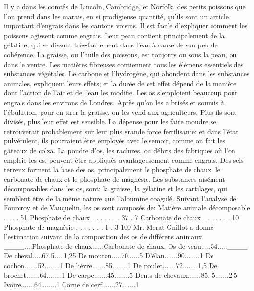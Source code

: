 Il y a dans les comtés de Lincoln, Cambridge, et Norfolk, des petits poissons que l'on prend dans les marais, en si prodigieuse quantité, qu'ils sont un article important d'engrais dans les cantons voisins.
Il est facile d'expliquer comment les poissons agissent comme engrais. Leur peau contient principalement de la gélatine, qui se dissout très-facilement dans l'eau à cause de son peu de cohérence. La graisse, ou l'huile des poissons, est toujours ou sous la peau, ou dans le ventre. Les matières fibreuses contiennent tous les élémens essentiels des substances végétales.
Le carbone et l'hydrogène, qui abondent dans les substances animales, expliquent leurs effets; et la durée de cet effet dépend de la manière dont l'action de l'air et de l'eau les modifie.\setcounter{page}{169} Les os s'emploient beaucoup pour engrais dans les environs de Londres. Après qu'on les a brisés et soumis à l'ébullition, pour en tirer la graisse, on les vend aux agriculteurs. Plus ils sont divisés, plus leur effet est sensible. La dépense pour les faire moudre se retrouverait probablement sur leur plus grande force fertilisante; et dans l'état pulvérulent, ils pourraient être employés avec le semoir, comme on fait les gâteaux de colza.
La poudre d'os, les raclures, ou débris des fabriques où l'on emploie les os, peuvent être appliqués avantageusement comme engrais.
Des sels terreux forment la base des os, principalement le phosphate de chaux, le carbonate de chaux et le phosphate de magnésie. Les substances aisément décomposables dans les os, sont: la graisse, la gélatine et les cartilages, qui semblent être de la même nature que l'albumine coagulé.
Suivant l'analyse de Fourcroy et de Vauquelin, les os sont composés de:
Matière animale décomposable . . . . 51
Phosphate de chaux . . . . . . . 37 . 7
Carbonate de chaux . . . . . . . 10
Phosphate de magnésie . . . . . . . 1 . 3
100
\setcounter{page}{170}
 Mr. Merat Gnillot a donné l'estimation suivant de la composition des os de différens animaux.
____....Phosphate de chaux......Carbonate de chaux.
Os de veau.....54.....____
De cheval.....67.5.....1,25
De mouton.....70......5
D'élan.......90........1
De cochon.......52........1
De lièvre.......85........1
De poulet.......72........1,5
De brochet.......64........1
De carpe.......45........5
Dents de chevaux.......85. 5.......2,5
Ivoire.......64........1
Corne de cerf.......27.......1

